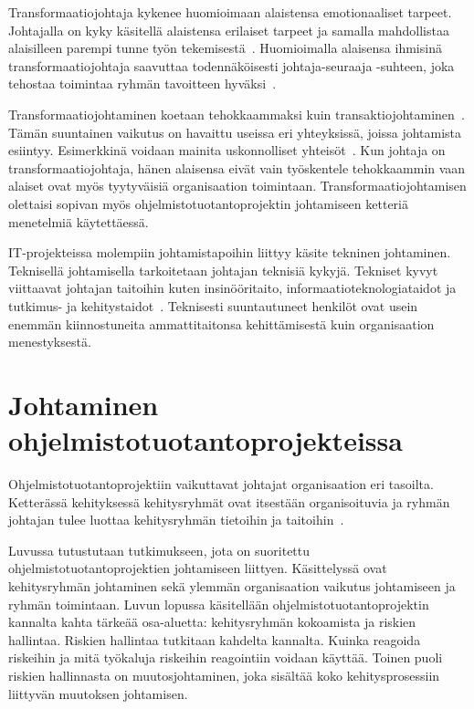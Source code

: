 \documentclass[finnish]{tktltiki2}
\theoremstyle{definition}
\theoremstyle{remark}
\begin{document}
Transformaatiojohtaja kykenee huomioimaan alaistensa emotionaaliset tarpeet. Johtajalla on kyky käsitellä alaistensa erilaiset tarpeet ja samalla mahdollistaa alaisilleen parempi tunne työn tekemisestä~\cite{palmer2001emotional}. Huomioimalla alaisensa ihmisinä transformaatiojohtaja saavuttaa todennäköisesti johtaja-seuraaja -suhteen, joka tehostaa toimintaa ryhmän tavoitteen hyväksi~\cite{raccoon2006leadership}.

Transformaatiojohtaminen koetaan tehokkaammaksi kuin transaktiojohtaminen~\cite{palmer2001emotional}. Tämän suuntainen vaikutus on havaittu useissa eri yhteyksissä, joissa johtamista esiintyy. Esimerkkinä voidaan mainita uskonnolliset yhteisöt~\cite{bass1990transactional}. Kun johtaja on transformaatiojohtaja, hänen alaisensa eivät vain työskentele tehokkaammin vaan alaiset ovat myös tyytyväisiä organisaation toimintaan. Transformaatiojohtamisen olettaisi sopivan myös ohjelmistotuotantoprojektin johtamiseen ketteriä menetelmiä käytettäessä.

IT-projekteissa molempiin johtamistapoihin liittyy käsite tekninen johtaminen. Teknisellä johtamisella tarkoitetaan johtajan teknisiä kykyjä. Tekniset kyvyt viittaavat johtajan taitoihin kuten insinööritaito, informaatioteknologiataidot ja tutkimus- ja kehitystaidot~\cite{thite2000leadership}. Teknisesti suuntautuneet henkilöt ovat usein enemmän kiinnostuneita ammattitaitonsa kehittämisestä kuin organisaation menestyksestä. 

   



  


\section{Johtaminen ohjelmistotuotantoprojekteissa}

Ohjelmistotuotantoprojektiin vaikuttavat johtajat organisaation eri tasoilta. Ketterässä kehityksessä kehitysryhmät ovat  itsestään organisoituvia ja ryhmän johtajan tulee luottaa kehitysryhmän tietoihin ja taitoihin~\cite{fowler2001agile}.

Luvussa tutustutaan tutkimukseen, jota on suoritettu ohjelmistotuotantoprojektien johtamiseen liittyen. Käsittelyssä ovat kehitysryhmän johtaminen sekä ylemmän organisaation vaikutus johtamiseen ja ryhmän toimintaan. Luvun lopussa käsitellään ohjelmistotuotantoprojektin kannalta kahta tärkeää osa-aluetta: kehitysryhmän kokoamista ja riskien hallintaa. Riskien hallintaa tutkitaan kahdelta kannalta. Kuinka reagoida riskeihin ja mitä työkaluja riskeihin reagointiin voidaan käyttää. Toinen puoli riskien hallinnasta on muutosjohtaminen, joka sisältää koko kehitysprosessiin liittyvän muutoksen johtamisen.
\end{document}
